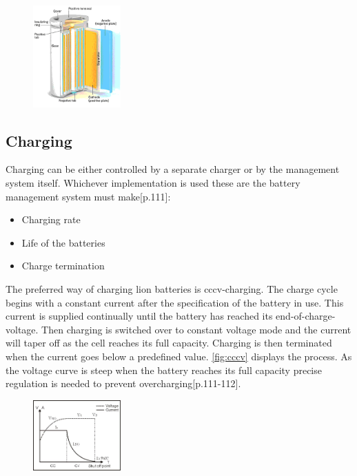 \begin{figure}[H]
	\centering
	\includegraphics[width=0.3\textwidth]{Figures/cellstruct.png}
	\label{fig:cellstruct}
\end{figure}

\subsection{Charging}
Charging can be either controlled by a separate charger or by the management system itself. Whichever implementation is used these are the battery management system must make\cite{book}[p.111]:

\begin{itemize}[noitemsep]
	\item Charging rate
	\item Life of the batteries
	\item Charge termination
\end{itemize}

The preferred way of charging \gls{lion} batteries is \gls{cccv}-charging. The charge cycle begins with a constant current after the specification of the battery in use. This current is supplied continually until the battery has reached its end-of-charge-voltage. Then charging is switched over to constant voltage mode and the current will taper off as the cell reaches its full capacity. Charging is then terminated when the current goes below a predefined value. \autoref{fig:cccv} displays the process. As the voltage curve is steep when the battery reaches its full capacity precise regulation is needed to prevent overcharging\cite{cccv}\cite{book}[p.111-112].

\begin{figure}[H]
	\centering
	\includegraphics[width=0.3\textwidth]{Figures/cccv.jpg}
	\label{fig:cccv}
\end{figure}

